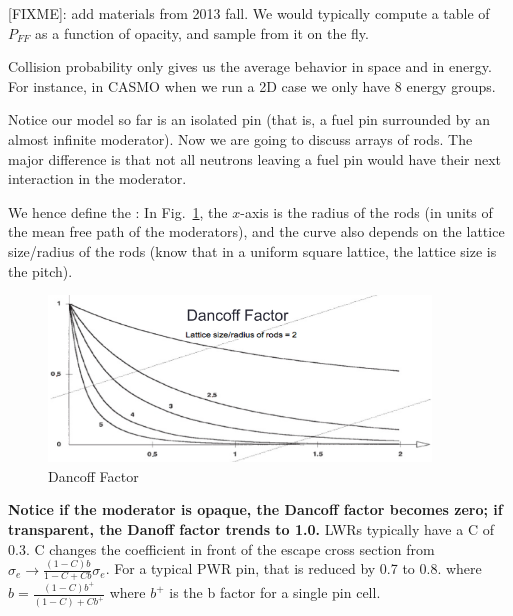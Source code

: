 \documentclass{school-22.211-notes}
\begin{document}
[FIXME]: add materials from 2013 fall. We would typically compute a table of $P_{FF}$ as a function of opacity, and sample from it on the fly. 

Collision probability only gives us the average behavior in space and in energy. For instance, in CASMO when we run a 2D case we only have 8 energy groups. 


\clearpage
{}
Notice our model so far is an isolated pin (that is, a fuel pin surrounded by an almost infinite moderator). Now we are going to discuss arrays of rods. The major difference is that not all neutrons leaving a fuel pin would have their next interaction in the moderator. 

We hence define the :
In Fig.~\ref{dancoff}, the $x$-axis is the radius of the rods (in units of the mean free path of the moderators), and the curve also depends on the lattice size/radius of the rods (know that in a uniform square lattice, the lattice size is the pitch).  
\begin{figure}[ht]
  \centering
  \includegraphics[width=4in]{images/r-m/dancoff.png}
  \caption{Dancoff Factor} \label{dancoff}
\end{figure}
\textbf{Notice if the moderator is opaque, the Dancoff factor becomes zero; if transparent, the Danoff factor trends to 1.0.}  LWRs typically have a C of 0.3. 
C changes the coefficient in front of the escape cross section from $\sigma_e \to \frac{(1-C)b}{1-C + Cb} \sigma_e$. For a typical PWR pin, that is reduced by 0.7 to 0.8.
where $b = \frac{(1-C)b^+}{(1-C) + C b^+}$ where $b^+$ is the b factor for a single pin cell. 
\end{document}
